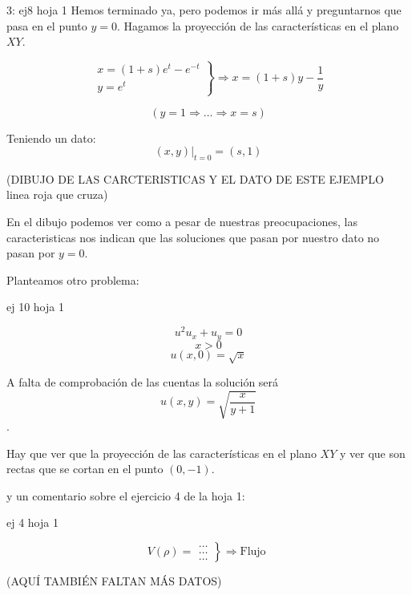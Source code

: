\begin{example}{3: ej8 hoja 1}
		Hemos terminado ya, pero podemos ir más allá y preguntarnos que pasa en el punto $y = 0$. Hagamos la proyección de las características en el plano $XY$.

		\[
		\left.
		\begin{array}{l}
			x = (1+s)e^t - e^{-t} \\
			y = e^{t}
		\end{array}
		\right\}
		\Rightarrow x = (1+s) y - \frac{1}{y}
		\]

		\[ (y = 1 \Rightarrow … \Rightarrow x = s )\]

		Teniendo un dato: \[ (x,y) |_{t=0} = (s,1) \]

		(DIBUJO DE LAS CARCTERISTICAS Y EL DATO DE ESTE EJEMPLO linea roja que cruza)

		En el dibujo podemos ver como a pesar de nuestras preocupaciones, las caracteristicas nos indican que las soluciones que pasan por nuestro dato no pasan por $y=0$.

	\end{example}

	Planteamos otro problema:

	\begin{example}{ej 10 hoja 1}

		\[ u^2u_x + u_y = 0 \]
		\[ x > 0 \]
		\[u(x,0) = \sqrt{x} \]

		A falta de comprobación de las cuentas la solución será \[u(x,y) = \sqrt{\frac{x}{y+1}} \].

		Hay que ver que la proyección de las características en el plano $XY$ y ver que son rectas que se cortan en el punto $(0,-1)$.

	\end{example}

	y un comentario sobre el ejercicio 4 de la hoja 1:

	\begin{example}{ej 4 hoja 1}

		\[ V(\rho) =
		\left.
		\begin{array}{l}
			… \\
			… \\
			…
		\end{array}
		\right\} \Rightarrow \text{Flujo }
		\]

		(AQUÍ TAMBIÉN FALTAN MÁS DATOS)

	\end{example}






















